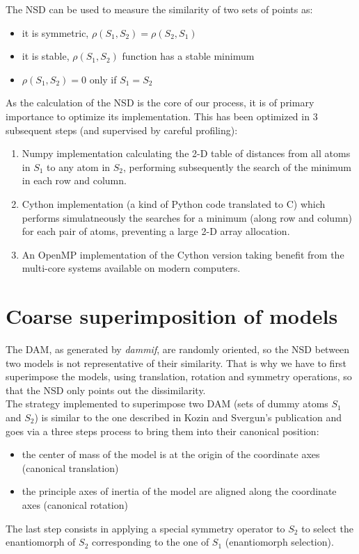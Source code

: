 \documentclass[a4paper, 11pt]{report}
\begin{document}
The NSD can be used to measure the similarity of two sets of points as:
\begin{itemize}
 \item it is symmetric, $\rho(S_{1},S_{2}) = \rho(S_{2},S_{1})$
 \item it is stable, $\rho(S_{1},S_{2})$ function has a stable minimum
 \item $\rho(S_{1},S_{2}) = 0$ only if $S_{1} = S_{2}$
\end{itemize}

As the calculation of the NSD is the core of our process, it is of 
primary importance to optimize its implementation. This has been 
optimized in 3 subsequent steps (and supervised by careful profiling):
\begin{enumerate}
  \item Numpy implementation calculating the 2-D table of distances from all
  atoms in $S_{1}$ to any atom in $S_{2}$, performing subsequently the search 
  of the minimum in each row and column.
  \item Cython implementation \cite{cython} (a kind of Python code translated
  to C) which performs simulatneously the searches for a minimum (along row 
  and column) for each pair of atoms, preventing a large 2-D array allocation.
  \item An OpenMP \cite{openmp} implementation of the Cython version taking
  benefit from the multi-core systems available on modern computers.
\end{enumerate}

\section{Coarse superimposition of models}

The DAM, as generated by \textit{dammif}, are randomly oriented, so the NSD
between two models is not representative of their similarity.
That is why we have to first superimpose the models, using 
translation, rotation and symmetry operations, so that the NSD only 
points out the dissimilarity.\\

The strategy implemented to superimpose two DAM (sets of
dummy atoms $S_{1}$ and $S_{2}$) is similar to the one described in 
Kozin and Svergun's publication \cite{supcomb} and goes via a three 
steps process to bring them into their canonical position:
\begin{itemize}
  \item the center of mass of the model is at the origin of the 
        coordinate axes (canonical translation)
  \item the principle axes of inertia of the model are aligned along 
        the coordinate axes (canonical rotation)
\end{itemize}
The last step consists in applying a special symmetry operator to 
$S_{2}$ to select the enantiomorph of $S_{2}$ corresponding to the one 
of $S_{1}$ (enantiomorph selection).
\end{document}
